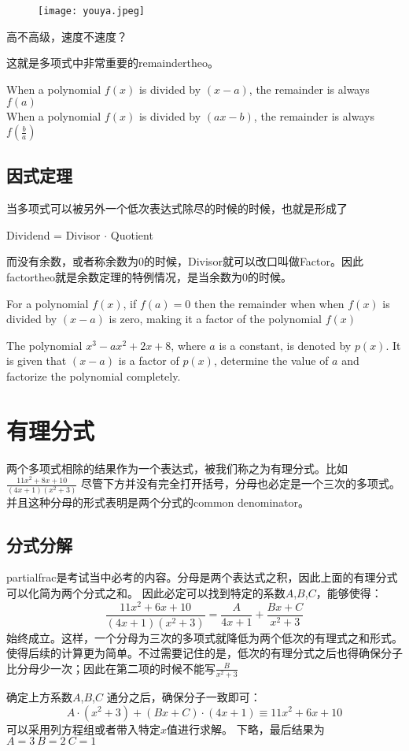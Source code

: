 \begin{figure}[H]
\centering
\texttt{[image: youya.jpeg]}
\end{figure}
高不高级，速度不速度？

这就是多项式中非常重要的\gls{remaindertheo}。
\begin{theorem}
When a polynomial $f(x)$ is divided by $(x-a)$, the remainder is always $f(a)$\\

When a polynomial $f(x)$ is divided by $(ax-b)$, the remainder is always $f\left(\frac{b}{a}\right)$
\end{theorem}

\subsection*{因式定理}
当多项式可以被另外一个低次表达式除尽的时候的时候，也就是形成了
\begin{center}
Dividend = Divisor $\cdot$ Quotient 
\end{center}
而没有余数，或者称余数为$0$的时候，Divisor就可以改口叫做Factor。因此\gls{factortheo}就是余数定理的特例情况，是当余数为$0$的时候。

\begin{theorem}
For a polynomial $f(x)$, if $f(a)=0$ then the remainder when when $f(x)$ is divided by $(x-a)$ is zero, making it a factor of the polynomial $f(x)$
\end{theorem}

\begin{TaskBox}
The polynomial $x^3-ax^2+2x+8$, where $a$ is a constant, is denoted by $p(x)$. It is given that $(x-a)$ is a factor of $p(x)$, determine the value of $a$ and factorize the polynomial completely.
\end{TaskBox}
\clearpage


\section{有理分式}
两个多项式相除的结果作为一个表达式，被我们称之为有理分式。比如 $\frac{11x^2+8x+10}{(4x+1)(x^2+3)}$ 尽管下方并没有完全打开括号，分母也必定是一个三次的多项式。并且这种分母的形式表明是两个分式的common denominator。

\subsection*{分式分解}
\gls{partialfrac}是考试当中必考的内容。分母是两个表达式之积，因此上面的有理分式可以化简为两个分式之和。
因此必定可以找到特定的系数$A$,$B$,$C$，能够使得：
\[
	\frac{11x^2+6x+10}{(4x+1)(x^2+3)}=\frac{A}{4x+1}+\frac{Bx+C}{x^2+3}
\]
始终成立。这样，一个分母为三次的多项式就降低为两个低次的有理式之和形式。使得后续的计算更为简单。不过需要记住的是，低次的有理分式之后也得确保分子比分母少一次；因此在第二项的时候不能写$\frac{B}{x^2+3}$
\begin{ExampleBox}
确定上方系数$A$,$B$,$C$
\tcblower
通分之后，确保分子一致即可：
\[A\cdot (x^2+3)+(Bx+C)\cdot (4x+1) \equiv 11x^2+6x+10\]
可以采用列方程组或者带入特定$x$值进行求解。
下略，最后结果为$A=3 \ B=2 \ C=1$
\end{ExampleBox}


